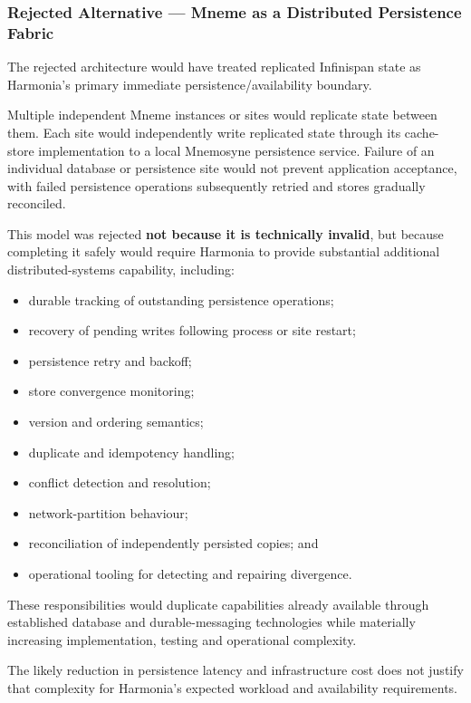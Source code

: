\subsubsection{Rejected Alternative --- Mneme as a Distributed Persistence Fabric}

The rejected architecture would have treated replicated Infinispan state as Harmonia's primary immediate persistence/availability boundary.

Multiple independent Mneme instances or sites would replicate state between them. Each site would independently write replicated state through its cache-store implementation to a local Mnemosyne persistence service. Failure of an individual database or persistence site would not prevent application acceptance, with failed persistence operations subsequently retried and stores gradually reconciled.

This model was rejected \textbf{not because it is technically invalid}, but because completing it safely would require Harmonia to provide substantial additional distributed-systems capability, including:
\begin{itemize}
    \item durable tracking of outstanding persistence operations;
    \item recovery of pending writes following process or site restart;
    \item persistence retry and backoff;
    \item store convergence monitoring;
    \item version and ordering semantics;
    \item duplicate and idempotency handling;
    \item conflict detection and resolution;
    \item network-partition behaviour;
    \item reconciliation of independently persisted copies; and
    \item operational tooling for detecting and repairing divergence.
\end{itemize}

These responsibilities would duplicate capabilities already available through established database and durable-messaging technologies while materially increasing implementation, testing and operational complexity.

The likely reduction in persistence latency and infrastructure cost does not justify that complexity for Harmonia's expected workload and availability requirements.

